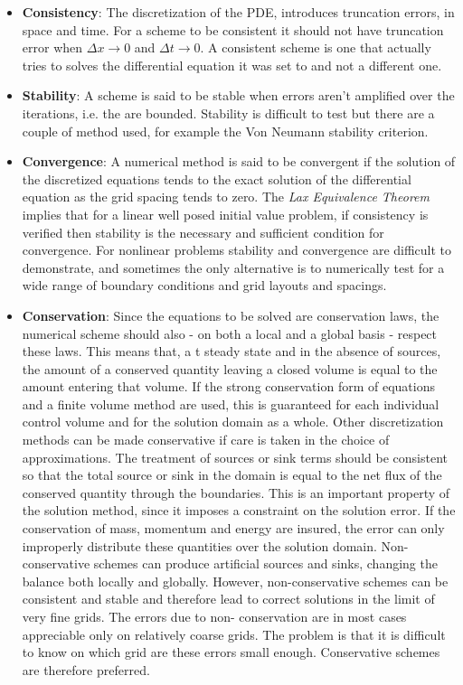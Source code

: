  \begin{itemize}
 \item \textbf{Consistency}: The discretization of the PDE, introduces truncation errors, in space and time. For a scheme to be consistent it should not have truncation error when $\Delta x  \rightarrow 0$  and $\Delta t \rightarrow 0$. A consistent scheme is one that actually tries to solves the differential equation it was set to and not a different one.

 \item \textbf{Stability}: A scheme is said to be stable when errors aren't amplified over the iterations, i.e. the are bounded. Stability is difficult to test but there are a couple of method used, for example the Von Neumann stability criterion.

 \item \textbf{Convergence}: A numerical method is said to be convergent if the solution of the discretized equations tends to the exact solution of the differential equation as the grid spacing tends to zero. The \emph{Lax Equivalence Theorem} implies that for a linear well posed initial value problem, if consistency is verified then stability is the necessary and sufficient condition for convergence. 
 For nonlinear problems stability and convergence are difficult to demonstrate, and sometimes the only alternative is to numerically test for a wide range of boundary conditions and grid layouts and spacings. 

 \item \textbf{Conservation}: Since the equations to be solved are conservation laws, the numerical scheme
should also - on both a local and a global basis - respect these laws. This
means that, a t steady state and in the absence of sources, the amount of a
conserved quantity leaving a closed volume is equal to the amount entering
that volume. If the strong conservation form of equations and a finite volume
method are used, this is guaranteed for each individual control volume and
for the solution domain as a whole. Other discretization methods can be made
conservative if care is taken in the choice of approximations. The treatment
of sources or sink terms should be consistent so that the total source or sink
in the domain is equal to the net flux of the conserved quantity through the
boundaries.
This is an important property of the solution method, since it imposes a
constraint on the solution error. If the conservation of mass, momentum and
energy are insured, the error can only improperly distribute these quantities
over the solution domain. Non-conservative schemes can produce artificial
sources and sinks, changing the balance both locally and globally. However,
non-conservative schemes can be consistent and stable and therefore lead
to correct solutions in the limit of very fine grids. The errors due to non-
conservation are in most cases appreciable only on relatively coarse grids.
The problem is that it is difficult to know on which grid are these errors
small enough. Conservative schemes are therefore preferred.


\end{itemize}
